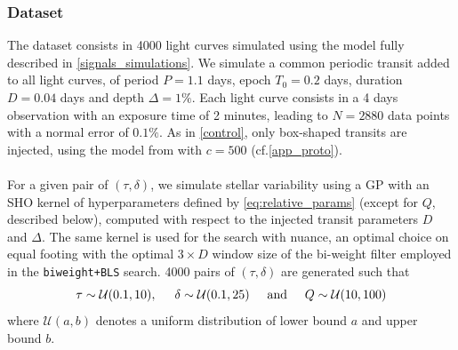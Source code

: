 \documentclass[modern]{aastex631}
\newcommand{\wtls}{\texttt{biweight+BLS}}
\begin{document}
\subsubsection*{Dataset}\label{sim_dataset}
The dataset consists in 4000 light curves simulated using the model fully described in \autoref{signals_simulations}. We simulate a common periodic transit added to all light curves, of period $P=1.1$ days, epoch $T_0=0.2$ days, duration $D=0.04$ days and depth $\Delta=1\%$. Each light curve consists in a 4 days observation with an exposure time of 2 minutes, leading to $N=2880$ data points with a normal error of $0.1\%$. As in \autoref{control}, only box-shaped transits are injected, using the model from \cite{protopapas} with $c=500$ (cf.\;\autoref{app_proto}).\\\\
For a given pair of $(\tau, \delta)$, we simulate stellar variability using a GP with an SHO kernel of hyperparameters defined by \autoref{eq:relative_params} (except for $Q$, described below), computed with respect to the injected transit parameters $D$ and $\Delta$. The same kernel is used for the search with \textsf{nuance}, an optimal choice on equal footing with the optimal $3\times D$ window size of the bi-weight filter employed in the \wtls{} search.
 4000 pairs of $(\tau, \delta)$ are generated such that
\begin{equation*}
    \tau \sim \mathcal{U}(0.1, 10), \hspace{0.5cm} \delta \sim \mathcal{U}(0.1, 25) \hspace{0.5cm}\text{and}\hspace{0.5cm} Q \sim \mathcal{U}(10, 100)
\end{equation*}
where $\mathcal{U}(a, b)$ denotes a uniform distribution of lower bound $a$ and upper bound $b$.
\end{document}
